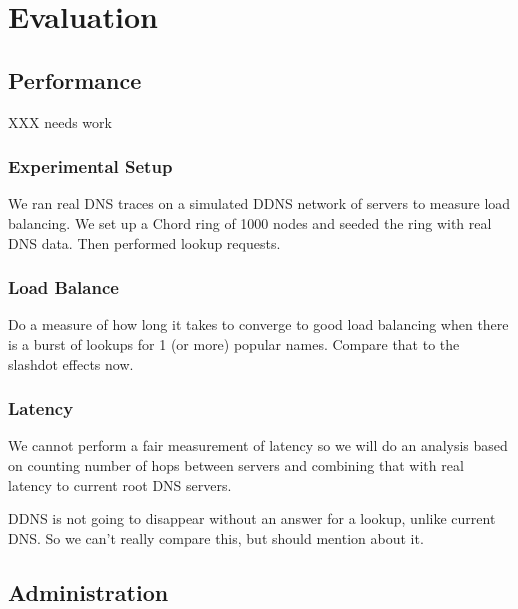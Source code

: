 \section{Evaluation}

\subsection{Performance}

XXX needs work

\subsubsection{Experimental Setup}

We ran real DNS traces on a simulated DDNS network
of servers to measure load balancing. We set up a
Chord ring of 1000 nodes and seeded the ring with 
real DNS data. Then performed lookup requests.

\subsubsection{Load Balance}

Do a measure of how long it takes to converge to good load 
balancing when there is a burst of lookups for 1 (or more)
popular names. Compare that to the slashdot effects now.

\subsubsection{Latency}

We cannot perform a fair measurement of latency so we will do an
analysis based on counting number of hops between servers
and combining that with real latency to current root DNS servers.

DDNS is not going to disappear without an answer for a lookup,
unlike current DNS. So we can't really compare this, but should
mention about it.

\subsection{Administration}

